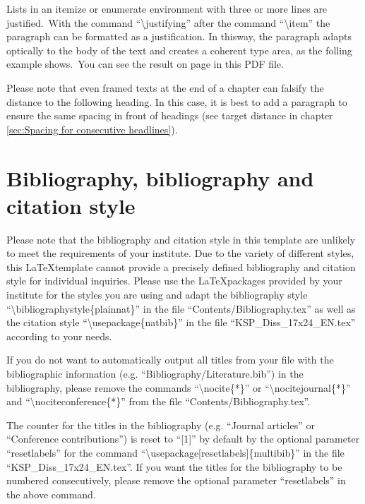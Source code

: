 Lists in an itemize or enumerate environment with three or more lines are justified.~With the command ``\textbackslash justifying'' after the command ``\textbackslash item'' the paragraph can be formatted as a justification. In thisway, the paragraph adapts op\-ti\-cally to the body of the text and creates a coherent type area, as the folling example shows.~You can see the result %
on page \pageref{itm:example-itemize} in this PDF file.


Please note that even framed texts at the end of a chapter can falsify the distance to the following heading. In this case, it is best to add a paragraph to ensure the same spacing in front of headings (see target distance in chapter \ref{sec:Spacing for consecutive headlines}).





\section{Bibliography, bibliography and citation style}
Please note that the bibliography and citation style in this template are unlikely to meet the requirements of your institute. Due to the variety of different styles, this \LaTeX template cannot provide a precisely defined bibliography and citation style for individual inquiries. Please use the \LaTeX packages provided by your institute for the styles you are using and adapt the bibliography style ``\textbackslash bibliographystyle\{plainnat\}'' in the file ``Contents/Bibliography.tex'' as well as the citation style ``\textbackslash usepackage\{natbib\}'' in the file ``KSP\_Diss\_17x24\_EN.tex'' according to your needs.

If you do not want to automatically output all titles from your file with the bibliographic information (e.g. ``Bibliography/Literature.bib'') in the bibliography, please remove the commands ``\textbackslash nocite\{*\}'' or ``\textbackslash nocitejournal\{*\}'' and ``\textbackslash nociteconference\{*\}'' from the file ``Contents/Bibliography.tex''.

The counter for the titles in the bibliography (e.g. ``Journal articles'' or ``Conference contributions'') is reset to ``[1]'' by default by the optional parameter ``resetlabels'' for the command ``\textbackslash usepackage[resetlabels]\{multibib\}'' in the file ``KSP\_Diss\_17x24\_EN.tex''. If you want the titles for the bibliography to be numbered consecutively, please remove the optional parameter ``resetlabels'' in the above command.




